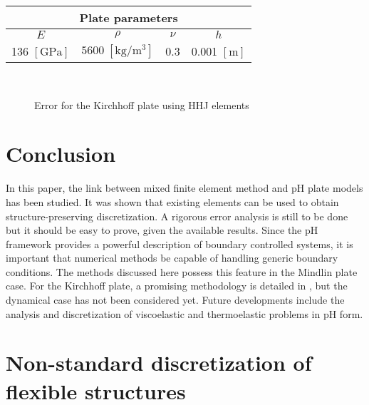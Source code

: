 \begin{table}[h]
	\centering
	\begin{tabular}{cccc}
		\hline 
		\multicolumn{4}{c}{Plate parameters} \\ 
		\hline 
		$E$ & $\rho$ & $\nu$  & $h$ \\
		136 $[\textrm{GPa}]$ & $5600\; [\textrm{kg}/\textrm{m}^3]$ & 0.3 &  0.001 $[\textrm{m}]$\\ 
		\hline 
	\end{tabular} 
	\captionsetup{width=0.95\linewidth}
	\vspace{1mm}
	\label{tab:parKir}
\end{table}

\begin{figure}[ht]%
	\centering
	\hspace{8pt}%
	 \\
	\caption[errorHHF]{Error for the Kirchhoff plate using HHJ elements}%
	\label{fig:errorHHJ}%
\end{figure}

\section{Conclusion}
In this paper, the link between mixed finite element method and pH plate models has been studied. It was shown that existing elements can be used to obtain structure-preserving discretization. A rigorous error analysis is still to be done but it should be easy to prove, given the available results. Since the pH framework provides a powerful description of boundary controlled systems, it is important that numerical methods be capable of handling generic boundary conditions. The methods discussed here possess this feature in the Mindlin plate case. For the Kirchhoff plate, a promising methodology is detailed in \cite{mixed_kirchhoff}, but the dynamical case has not been considered yet. Future developments include the analysis and discretization of viscoelastic and thermoelastic problems in pH form.



\section{Non-standard discretization of flexible structures}


